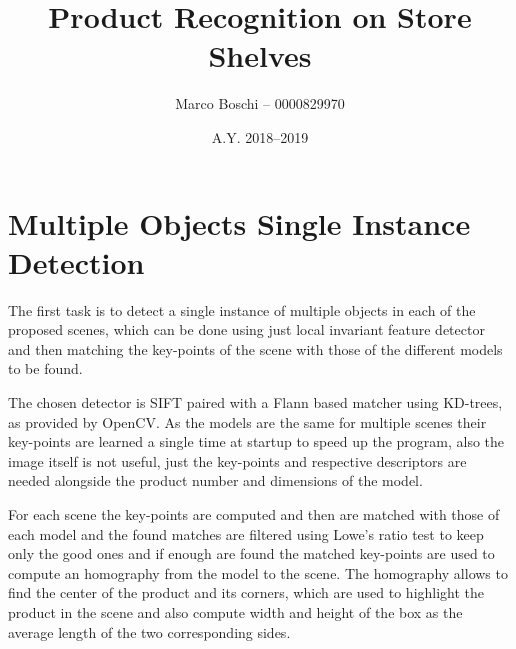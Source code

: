 

\title{Product Recognition on Store Shelves}
\date{A.Y. 2018--2019}
\author{Marco Boschi -- 0000829970}




\section{Multiple Objects Single Instance Detection}
The first task is to detect a single instance of multiple objects in each of the proposed scenes, which can be done using just local invariant feature detector and then matching the key-points of the scene with those of the different models to be found.

The chosen detector is SIFT paired with a Flann based matcher using KD-trees, as provided by OpenCV.
As the models are the same for multiple scenes their key-points are learned a single time at startup to speed up the program, also the image itself is not useful, just the key-points and respective descriptors are needed alongside the product number and dimensions of the model.

For each scene the key-points are computed and then are matched with those of each model and the found matches are filtered using Lowe's ratio test to keep only the good ones and if enough are found the matched key-points are used to compute an homography from the model to the scene.
The homography allows to find the center of the product and its corners, which are used to highlight the product in the scene and also compute width and height of the box as the average length of the two corresponding sides.




